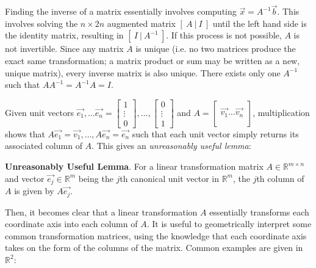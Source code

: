 Finding the inverse of a matrix essentially involves computing $\vec{x} = A^{-1} \vec{b}$. This involves solving the $n\times 2n$ augmented matrix $[\ A\ |\ I\ ]$ until the left hand side is the identity matrix, resulting in $[\ I\ |\ A^{-1}\ ]$. If this process is not possible, $A$ is not invertible. Since any matrix $A$ is unique (i.e. no two matrices produce the exact same transformation; a matrix product or sum may be written as a new, unique matrix), every inverse matrix is also unique. There exists only one $A^{-1}$ such that $AA^{-1} = A^{-1}A = I$.

Given unit vectors $\vec{e_1},\dots \vec{e_n} = \begin{bmatrix}
    1\\
    \vdots\\
    0
\end{bmatrix},\dots,\begin{bmatrix}
    0\\
    \vdots\\
    1
\end{bmatrix}$ and $A = \begin{bmatrix}
    \\
    \vec{v_1} \dots \vec{v_n}\\
    \\
\end{bmatrix}$, multiplication shows that $A\vec{e_1} = \vec{v_1}, \dots, A\vec{e_n} = \vec{e_n}$ such that each unit vector simply returns its associated column of $A$. This gives an \textit{unreasonably useful lemma}: 
\begin{shaded}
    \textbf{Unreasonably Useful Lemma}. For a linear transformation matrix $A\in\mathbb{R}^{m\times n}$ and vector $\vec{e_j}\in\mathbb{R}^m$ being the $j$th canonical unit vector in $\mathbb{R}^m$, the $j$th column of $A$ is given by $A\vec{e_j}$.  
\end{shaded}
Then, it becomes clear that a linear transformation $A$ essentially transforms each coordinate axis into each column of $A$. It is useful to geometrically interpret some common transformation matrices, using the knowledge that each coordinate axis takes on the form of the columns of the matrix. Common examples are given in $\mathbb{R}^2$:

